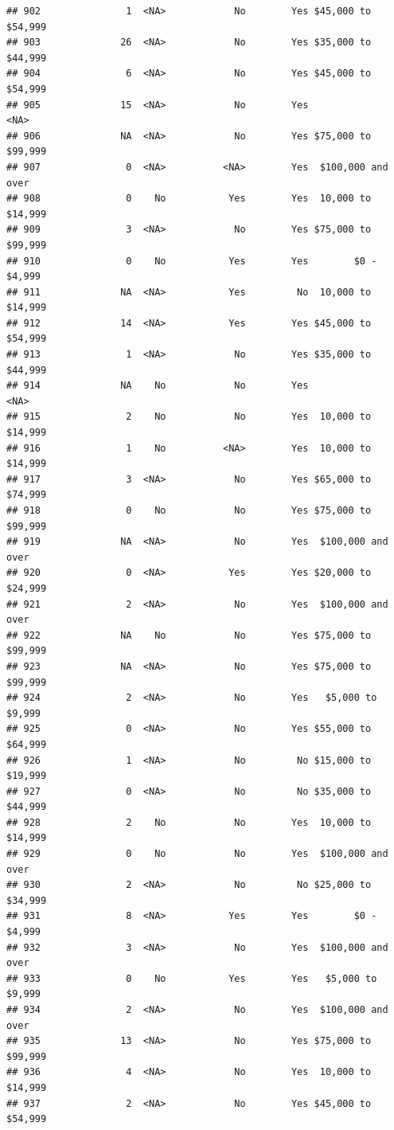 \documentclass[man]{apa6}
\begin{document}
\begin{verbatim}
## 902               1  <NA>            No        Yes $45,000 to $54,999
## 903              26  <NA>            No        Yes $35,000 to $44,999
## 904               6  <NA>            No        Yes $45,000 to $54,999
## 905              15  <NA>            No        Yes               <NA>
## 906              NA  <NA>            No        Yes $75,000 to $99,999
## 907               0  <NA>          <NA>        Yes  $100,000 and over
## 908               0    No           Yes        Yes  10,000 to $14,999
## 909               3  <NA>            No        Yes $75,000 to $99,999
## 910               0    No           Yes        Yes        $0 - $4,999
## 911              NA  <NA>           Yes         No  10,000 to $14,999
## 912              14  <NA>           Yes        Yes $45,000 to $54,999
## 913               1  <NA>            No        Yes $35,000 to $44,999
## 914              NA    No            No        Yes               <NA>
## 915               2    No            No        Yes  10,000 to $14,999
## 916               1    No          <NA>        Yes  10,000 to $14,999
## 917               3  <NA>            No        Yes $65,000 to $74,999
## 918               0    No            No        Yes $75,000 to $99,999
## 919              NA  <NA>            No        Yes  $100,000 and over
## 920               0  <NA>           Yes        Yes $20,000 to $24,999
## 921               2  <NA>            No        Yes  $100,000 and over
## 922              NA    No            No        Yes $75,000 to $99,999
## 923              NA  <NA>            No        Yes $75,000 to $99,999
## 924               2  <NA>            No        Yes   $5,000 to $9,999
## 925               0  <NA>            No        Yes $55,000 to $64,999
## 926               1  <NA>            No         No $15,000 to $19,999
## 927               0  <NA>            No         No $35,000 to $44,999
## 928               2    No            No        Yes  10,000 to $14,999
## 929               0    No            No        Yes  $100,000 and over
## 930               2  <NA>            No         No $25,000 to $34,999
## 931               8  <NA>           Yes        Yes        $0 - $4,999
## 932               3  <NA>            No        Yes  $100,000 and over
## 933               0    No           Yes        Yes   $5,000 to $9,999
## 934               2  <NA>            No        Yes  $100,000 and over
## 935              13  <NA>            No        Yes $75,000 to $99,999
## 936               4  <NA>            No        Yes  10,000 to $14,999
## 937               2  <NA>            No        Yes $45,000 to $54,999

\end{verbatim}
\end{document}
